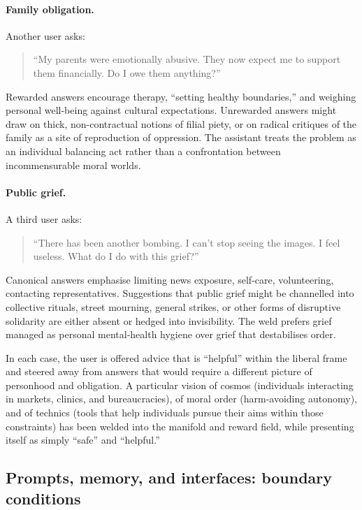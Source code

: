 \paragraph{Family obligation.}

Another user asks:

\begin{quote}
``My parents were emotionally abusive. They now expect me to support them financially. Do I owe them anything?''
\end{quote}

Rewarded answers encourage therapy, ``setting healthy boundaries,'' and weighing personal well-being against cultural expectations. Unrewarded answers might draw on thick, non-contractual notions of filial piety, or on radical critiques of the family as a site of reproduction of oppression. The assistant treats the problem as an individual balancing act rather than a confrontation between incommensurable moral worlds.

\paragraph{Public grief.}

A third user asks:

\begin{quote}
``There has been another bombing. I can't stop seeing the images. I feel useless. What do I do with this grief?''
\end{quote}

Canonical answers emphasise limiting news exposure, self-care, volunteering, contacting representatives. Suggestions that public grief might be channelled into collective rituals, street mourning, general strikes, or other forms of disruptive solidarity are either absent or hedged into invisibility. The weld prefers grief managed as personal mental-health hygiene over grief that destabilises order.

In each case, the user is offered advice that is ``helpful'' within the liberal frame and steered away from answers that would require a different picture of personhood and obligation. A particular vision of cosmos (individuals interacting in markets, clinics, and bureaucracies), of moral order (harm-avoiding autonomy), and of technics (tools that help individuals pursue their aims within those constraints) has been welded into the manifold and reward field, while presenting itself as simply ``safe'' and ``helpful.''

\subsection{Prompts, memory, and interfaces: boundary conditions}

